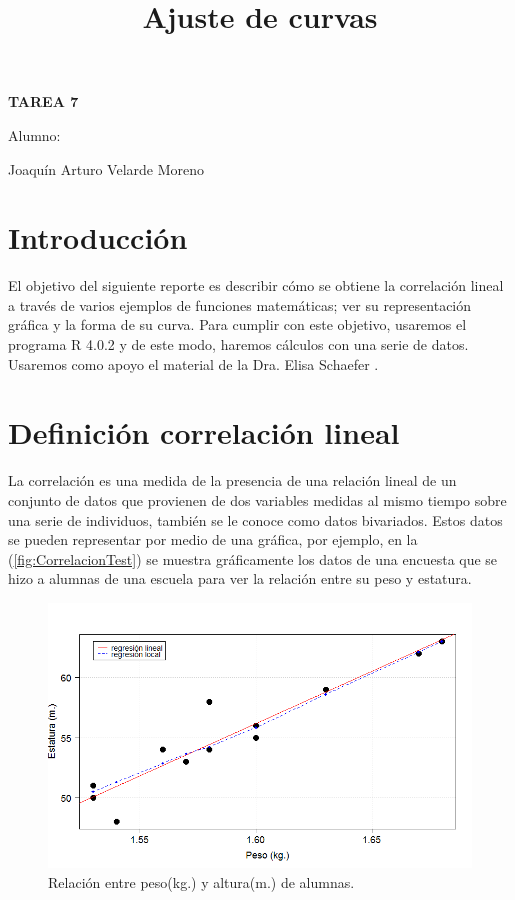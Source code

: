 \documentclass[]{article}
\title{Ajuste de curvas }
\date{}
\begin{document}
	\maketitle
	\begin{center}


\centerline{\textbf{TAREA 7} } 
\textbf{ }

\centerline{Alumno: } 
\centerline{Joaquín Arturo Velarde Moreno}


	\end{center}
	

\section{Introducción}
El objetivo del siguiente reporte es describir cómo se obtiene la correlación lineal a través de varios ejemplos de funciones matemáticas; ver su representación gráfica y la forma de su curva. Para cumplir con este objetivo, usaremos el programa R 4.0.2 \cite{rproject} y de este modo, haremos cálculos con una serie de datos.
Usaremos como apoyo el material de la Dra. Elisa Schaefer \cite{MaterialClase}.


\section{Definición correlación lineal}

La correlación es una medida de la presencia de una relación lineal de un conjunto de datos que provienen de dos variables medidas al mismo tiempo sobre una serie de individuos, también se le conoce como datos bivariados. Estos datos se pueden representar por medio de una gráfica, por ejemplo, en la (\autoref{fig:CorrelacionTest}) se muestra gráficamente los datos de una encuesta que se hizo a alumnas de una escuela para ver la relación entre su peso y estatura.


\begin{figure}[hbt!] 
\centering \includegraphics[width=.7\linewidth]{Figuras/CorrelacionTest.png}                 \caption{Relación entre peso(kg.) y altura(m.) de alumnas.}
\label{fig:CorrelacionTest}
\end{figure}
\end{document}
